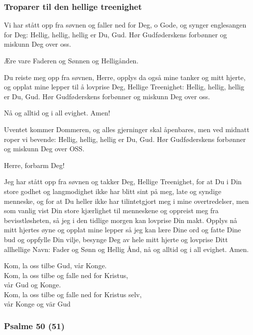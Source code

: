 \subsubsection{Troparer til den hellige treenighet}

Vi har stått opp fra søvnen og faller ned for Deg, o Gode, og synger englesangen for Deg: Hellig, hellig, hellig er Du, Gud. Hør Gudføderskens forbønner og miskunn Deg over oss.

Ære vare Faderen og Sønnen og Helligånden.

Du reiste meg opp fra søvnen, Herre, opplys da også mine tanker og mitt hjerte, og opplat mine lepper til å lovprise Deg, Hellige Treenighet: Hellig, hellig, hellig er Du, Gud. Hør Gudføderskens forbønner og miskunn Deg over oss.

Nå og alltid og i all evighet. Amen!

Uventet kommer Dommeren, og alles gjerninger skal åpenbares, men ved midnatt roper vi bevende: Hellig, hellig, hellig er Du, Gud. Hør Gudføderskens forbønner og miskunn Deg over OSS.

Herre, forbarm Deg! 

Jeg har stått opp fra søvnen og takker Deg, Hellige Treenighet, for at Du i Din store godhet og langmodighet ikke har blitt sint på meg, late og syndige menneske, og for at Du heller ikke har tilintetgjort meg i mine overtredelser, men som vanlig vist Din store kjærlighet til menneskene og oppreist meg fra bevisstløsheten, så jeg i den tidlige morgen kan lovprise Din makt. Opplys nå mitt hjertes øyne og opplat mine lepper så jeg kan lære Dine ord og fatte Dine bud og oppfylle Din vilje, besynge Deg av hele mitt hjerte og lovprise Ditt allhellige Navn: Fader og Sønn og Hellig Ånd, nå og alltid og i all evighet. Amen.

Kom, la oss tilbe Gud, vår Konge.\\
Kom, la oss tilbe og falle ned for Kristus,\\
\customPrayerIndent vår Gud og Konge.\\
Kom, la oss tilbe og falle ned for Kristus selv,\\ 
\customPrayerIndent vår Konge og vär Gud

\subsubsection{Psalme 50 (51)}

